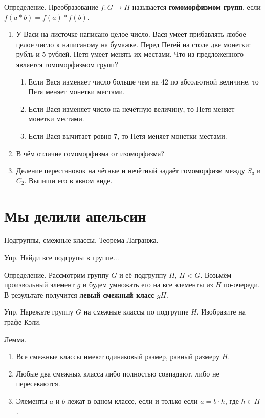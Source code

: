 \documentclass[12pt]{article} %
\begin{document}
Определение. Преобразование $f:G \to H$ называется \textbf{гомоморфизмом групп}, если $f(a * b) = f(a) * f(b)$.

\begin{enumerate}
\item У Васи на листочке написано целое число. Вася умеет прибавлять любое целое число к написаному на бумажке. Перед Петей на столе две монетки: рубль и 5 рублей. Петя умеет менять их местами. Что из предложенного является гомоморфизмом групп?
\begin{enumerate}
  \item Если Вася изменяет число больше чем на 42 по абсолютной величине, то Петя меняет монетки местами.
  \item Если Вася изменяет число на нечётную величину, то Петя меняет монетки местами.
  \item Если Вася вычитает ровно 7, то Петя меняет монетки местами.
\end{enumerate}

\item В чём отличие гомоморфизма от изоморфизма?
\item Деление перестановок на чётные и нечётный задаёт гомоморфизм между $S_3$ и $C_2$. Выпиши его в явном виде.
\end{enumerate}



\newpage
\section{Мы делили апельсин}




Подгруппы, смежные классы. Теорема Лагранжа.

Упр. Найди все подгрупы в группе...


Определение. Рассмотрим группу $G$ и её подгруппу $H$, $H<G$. Возьмём произвольный элемент $g$ и будем умножать его на все элементы из $H$ по-очереди. В результате получится \textbf{левый смежный класс $gH$}.


Упр. Нарежьте группу $G$ на смежные классы по подгруппе $H$. Изобразите на графе Кэли.


Лемма.
\begin{enumerate}
\item Все смежные классы имеют одинаковый размер, равный размеру $H$.
\item Любые два смежных класса либо полностью совпадают, либо не пересекаются.
\item Элементы $a$ и $b$ лежат в одном классе, если и только если $a=b\cdot h$, где $h\in H$.
\end{enumerate}
\end{document}
